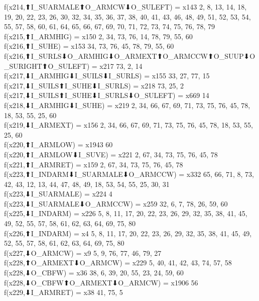 f(x214,⬆I_SUARMALE⬆O_ARMCW⬇O_SULEFT) = x143 {2, 8, 13, 14, 18, 19, 20, 22, 23, 26, 30, 32, 34, 35, 36, 37, 38, 40, 41, 43, 46, 48, 49, 51, 52, 53, 54, 55, 57, 58, 60, 61, 64, 65, 66, 67, 69, 70, 71, 72, 73, 74, 75, 76, 78, 79} \\
f(x215,⬆I_ARMHIG) = x150 {2, 34, 73, 76, 14, 78, 79, 55, 60} \\
f(x216,⬆I_SUHE) = x153 {34, 73, 76, 45, 78, 79, 55, 60} \\
f(x216,⬆I_SURLS⬇O_ARMHIG⬇O_ARMEXT⬆O_ARMCCW⬆O_SUUP⬇O_SURIGHT⬆O_SULEFT) = x217 {73, 2, 14} \\
f(x217,⬇I_ARMHIG⬇I_SUILS⬇I_SURLS) = x155 {33, 27, 77, 15} \\
f(x217,⬇I_SUILS⬆I_SUHE⬇I_SURLS) = x218 {73, 25, 2} \\
f(x217,⬇I_SUILS⬆I_SUHE⬇I_SURLS⬇O_SULEFT) = x669 {14} \\
f(x218,⬇I_ARMHIG⬇I_SUHE) = x219 {2, 34, 66, 67, 69, 71, 73, 75, 76, 45, 78, 18, 53, 55, 25, 60} \\
f(x219,⬇I_ARMEXT) = x156 {2, 34, 66, 67, 69, 71, 73, 75, 76, 45, 78, 18, 53, 55, 25, 60} \\
f(x220,⬆I_ARMLOW) = x1943 {60} \\
f(x220,⬆I_ARMLOW⬇I_SUVE) = x221 {2, 67, 34, 73, 75, 76, 45, 78} \\
f(x221,⬆I_ARMRET) = x159 {2, 67, 34, 73, 75, 76, 45, 78} \\
f(x223,⬆I_INDARM⬇I_SUARMALE⬇O_ARMCCW) = x332 {65, 66, 71, 8, 73, 42, 43, 12, 13, 44, 47, 48, 49, 18, 53, 54, 55, 25, 30, 31} \\
f(x223,⬇I_SUARMALE) = x224 {4} \\
f(x223,⬇I_SUARMALE⬇O_ARMCCW) = x259 {32, 6, 7, 78, 26, 59, 60} \\
f(x225,⬇I_INDARM) = x226 {5, 8, 11, 17, 20, 22, 23, 26, 29, 32, 35, 38, 41, 45, 49, 52, 55, 57, 58, 61, 62, 63, 64, 69, 75, 80} \\
f(x226,⬆I_INDARM) = x4 {5, 8, 11, 17, 20, 22, 23, 26, 29, 32, 35, 38, 41, 45, 49, 52, 55, 57, 58, 61, 62, 63, 64, 69, 75, 80} \\
f(x227,⬇O_ARMCW) = x9 {5, 9, 76, 77, 46, 79, 27} \\
f(x228,⬆O_ARMEXT⬇O_ARMCW) = x229 {5, 40, 41, 42, 43, 74, 57, 58} \\
f(x228,⬇O_CBFW) = x36 {38, 6, 39, 20, 55, 23, 24, 59, 60} \\
f(x228,⬇O_CBFW⬆O_ARMEXT⬇O_ARMCW) = x1906 {56} \\
f(x229,⬇I_ARMRET) = x38 {41, 75, 5} \\
